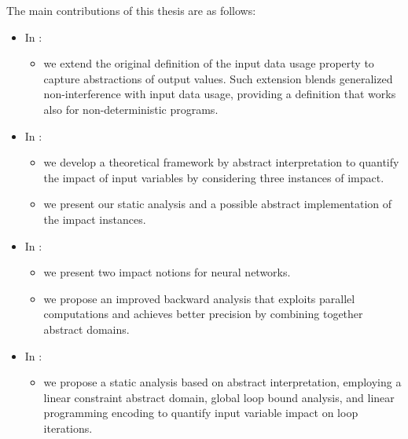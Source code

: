 The main contributions of this thesis are as follows:
\begin{itemize}
  \item In :
  \begin{itemize}
    \item we extend the original definition of the input data usage property to capture abstractions of output values.
    Such extension blends generalized non-interference with input data usage, providing a definition that works also for non-deterministic programs.
  \end{itemize}
  \item In :
    \begin{itemize}
      \item we develop a theoretical framework by abstract interpretation to quantify the impact of input variables by considering three instances of impact.
      \item we present our static analysis and a possible abstract implementation of the impact instances.
    \end{itemize}
  \item In :
    \begin{itemize}
      \item we present two impact notions for neural networks.
      \item we propose an improved backward analysis that exploits parallel computations and achieves better precision by combining together abstract domains.
    \end{itemize}
  \item In :
    \begin{itemize}
      \item we propose a static analysis based on abstract interpretation, employing a linear constraint abstract domain, global loop bound analysis, and linear programming encoding to quantify input variable impact on loop iterations.
    \end{itemize}
\end{itemize}
